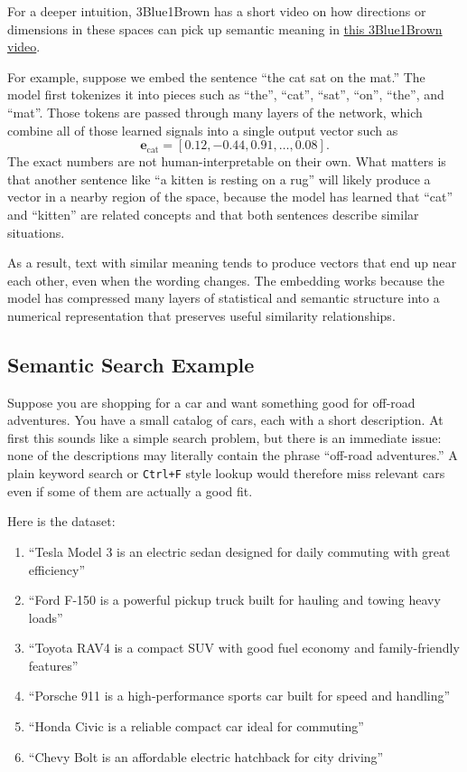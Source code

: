 \documentclass[12pt]{article}
\begin{document}
For a deeper intuition, 3Blue1Brown has a short video on how directions or
dimensions in these spaces can pick up semantic meaning in
\href{https://youtube.com/shorts/FJtFZwbvkI4?si=rtebhzbhDrnXiyIL}{this
3Blue1Brown video}.

For example, suppose we embed the sentence ``the cat sat on the mat.'' The
model first tokenizes it into pieces such as ``the'', ``cat'', ``sat'',
``on'', ``the'', and ``mat''. Those tokens are passed through many layers
of the network, which combine all of those learned signals into a single
output vector such as
\[
\mathbf{e}_{\text{cat}} = [0.12, -0.44, 0.91, \dots, 0.08].
\]
The exact numbers are not human-interpretable on their own. What matters
is that another sentence like ``a kitten is resting on a rug'' will likely
produce a vector in a nearby region of the space, because the model has
learned that ``cat'' and ``kitten'' are related concepts and that both
sentences describe similar situations.

As a result, text with similar meaning tends to produce vectors that end
up near each other, even when the wording changes. The embedding works
because the model has compressed many layers of statistical and semantic
structure into a numerical representation that preserves useful similarity
relationships.

\subsection{Semantic Search Example}

Suppose you are shopping for a car and want something good for
off-road adventures. You have a small catalog of cars, each with a short
description. At first this sounds like a simple search problem, but there
is an immediate issue: none of the descriptions may literally contain the
phrase ``off-road adventures.'' A plain keyword search or \texttt{Ctrl+F}
style lookup would therefore miss relevant cars even if some of them are
actually a good fit.

Here is the dataset:

\begin{enumerate}
    \item ``Tesla Model 3 is an electric sedan designed for daily commuting with great efficiency''
    \item ``Ford F-150 is a powerful pickup truck built for hauling and towing heavy loads''
    \item ``Toyota RAV4 is a compact SUV with good fuel economy and family-friendly features''
    \item ``Porsche 911 is a high-performance sports car built for speed and handling''
    \item ``Honda Civic is a reliable compact car ideal for commuting''
    \item ``Chevy Bolt is an affordable electric hatchback for city driving''
\end{enumerate}
\end{document}
